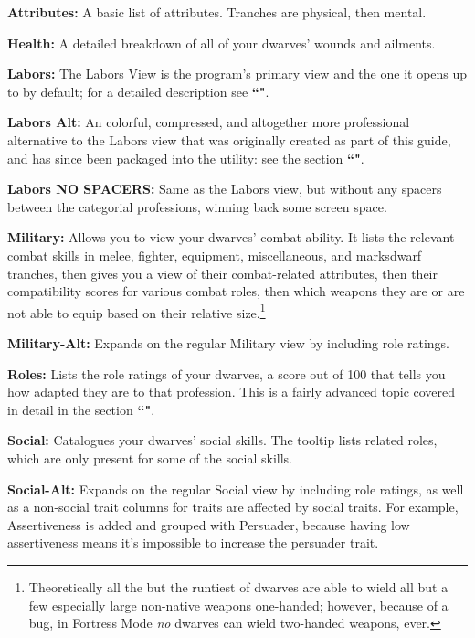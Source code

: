 \documentclass[]{article}
\begin{document}
\noindent\textbf{Attributes:} A basic list of attributes. Tranches are physical, then mental.


\noindent\textbf{Health:} A detailed breakdown of all of your dwarves' wounds and ailments.


\noindent\textbf{Labors:} The Labors View is the program's primary view and the one it opens up to by
default; for a detailed description see \textbf{``"}.


\noindent\textbf{Labors Alt:} An colorful, compressed, and altogether more professional alternative to
the Labors view that was originally created as part of this guide, and has since been packaged into the
utility: see the section \textbf{``"}.


\noindent\textbf{Labors NO SPACERS:} Same as the Labors view, but without any spacers between the
categorial professions, winning back some screen space.


\noindent\textbf{Military:} Allows you to view your dwarves' combat ability. It lists the relevant combat
skills in melee, fighter, equipment, miscellaneous, and marksdwarf tranches, then gives you a view of
their combat-related attributes,  then their compatibility scores for various combat roles, then which
weapons they are or are not able to equip based on their relative size.\footnote{Theoretically all the
but the runtiest of dwarves are able to wield all but a few especially large non-native weapons
one-handed; however, because of a bug, in Fortress Mode \emph{no} dwarves can wield two-handed weapons,
ever.}


\noindent\textbf{Military-Alt:} Expands on the regular Military view by including role ratings.


\noindent\textbf{Roles:} Lists the role ratings of your dwarves, a score out of 100 that tells you how
adapted they are to that profession. This is a fairly advanced topic covered in detail in the section
\textbf{``"}.


\noindent\textbf{Social:} Catalogues your dwarves' social skills. The tooltip lists related roles, which
are only present for some of the social skills.


\noindent\textbf{Social-Alt:} Expands on the regular Social view by including role ratings, as well as a
non-social trait columns for traits are affected by social traits. For example, Assertiveness is added
and grouped with Persuader, because having low assertiveness means it's impossible to increase the
persuader trait.
\end{document}
